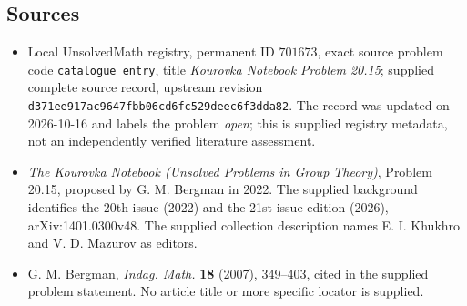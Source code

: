 \documentclass[11pt]{article}
\begin{document}
\subsection{Sources}
\begin{itemize}
\item Local UnsolvedMath registry, permanent ID \(701673\), exact source problem code \texttt{catalogue entry}, title \emph{Kourovka Notebook Problem 20.15}; supplied complete source record, upstream revision \texttt{d371ee917ac9647fbb06cd6fc529deec6f3dda82}. The record was updated on 2026-10-16 and labels the problem \emph{open}; this is supplied registry metadata, not an independently verified literature assessment.
\item \emph{The Kourovka Notebook (Unsolved Problems in Group Theory)}, Problem 20.15, proposed by G. M. Bergman in 2022. The supplied background identifies the 20th issue (2022) and the 21st issue edition (2026), arXiv:1401.0300v48. The supplied collection description names E. I. Khukhro and V. D. Mazurov as editors.
\item G. M. Bergman, \emph{Indag. Math.} \textbf{18} (2007), 349--403, cited in the supplied problem statement. No article title or more specific locator is supplied.
\end{itemize}
\end{document}
